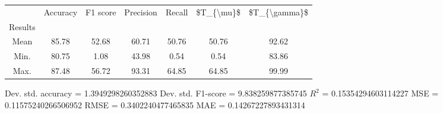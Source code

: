 \begin{tabular}{|c|c|c|c|c|c|c|}
\toprule
{} &  Accuracy &  F1 score &  Precision &  Recall &  \$T\_\{\textbackslash mu\}\$ &  \$T\_\{\textbackslash gamma\}\$ \\
Results &           &           &            &         &            &               \\
\hline
Mean    &     85.78 &     52.68 &      60.71 &   50.76 &      50.76 &         92.62 \\
Min.    &     80.75 &      1.08 &      43.98 &    0.54 &       0.54 &         83.86 \\
Max.    &     87.48 &     56.72 &      93.31 &   64.85 &      64.85 &         99.99 \\
\bottomrule
\end{tabular}

 Dev. std. accuracy = 1.3949298260352883
 Dev. std. F1-score = 9.838259877385745
 $R^2$ = 0.15354294603114227
 MSE = 0.11575240266506952
 RMSE = 0.3402240477465835
 MAE = 0.14267227893431314